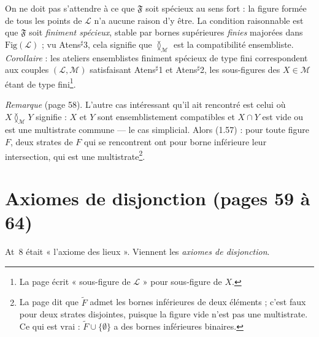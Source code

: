 \documentclass[11pt,a4paper]{article}
\begin{document}
On ne doit pas s'attendre à ce que $\mathfrak{F}$ soit spécieux au sens fort :
la figure formée de tous les points de $\mathcal{L}$ n'a aucune raison d'y être.
La condition raisonnable est que $\mathfrak{F}$ soit \emph{finiment spécieux},
stable par bornes supérieures \emph{finies} majorées dans
$\mathrm{Fig}(\mathcal{L})$ ; vu Atens$^{\sharp}$3, cela signifie que
$\between_{\mathcal{M}}$ est la compatibilité ensembliste. \emph{Corollaire} :
les ateliers ensemblistes finiment spécieux de type fini correspondent aux
couples $(\mathcal{L}, \mathcal{M})$ satisfaisant Atens$^{\sharp}$1 et
Atens$^{\sharp}$2, les sous-figures des $X \in \mathcal{M}$ étant de type
fini\footnote{La page écrit « sous-figure de $\mathcal{L}$ » pour sous-figure de
$X$.}.

\emph{Remarque} (page 58). L'autre cas intéressant qu'il ait rencontré est celui
où $X \between_{\mathcal{M}} Y$ signifie : $X$ et $Y$ sont ensemblistement
compatibles et $X \cap Y$ est vide ou est une multistrate commune --- le cas
simplicial. Alors (1.57) : pour toute figure $F$, deux strates de $F$ qui se
rencontrent ont pour borne inférieure leur intersection, qui est une
multistrate\footnote{La page dit que $\widetilde{F}$ admet les bornes
inférieures de deux éléments ; c'est faux pour deux strates disjointes, puisque
la figure vide n'est pas une multistrate. Ce qui est vrai : $\widetilde{F} \cup
\lbrace \emptyset \rbrace$ a des bornes inférieures binaires.}.

\section*{Axiomes de disjonction (pages 59 à 64)}

At~8 était « l'axiome des lieux ». Viennent les \emph{axiomes de disjonction}.
\end{document}

